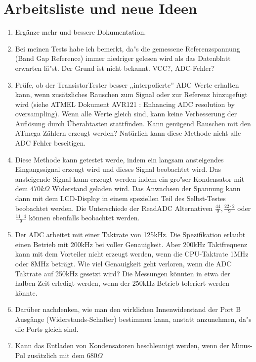
\chapter{Arbeitsliste und neue Ideen}
\label{sec:todo}

\begin{enumerate}
\item Erg\"anze mehr und bessere Dokumentation.
\item Bei meinen Tests habe ich bemerkt, da"s die gemessene Referenzspannung (Band Gap Reference) immer niedriger gelesen
wird als das Datenblatt erwarten l\"a"st.
Der Grund ist nicht bekannt. VCC?, ADC-Fehler?
\item Pr\"ufe, ob der TransistorTester besser ,,interpolierte''  ADC Werte erhalten kann, wenn zus\"atz\-liches Rauschen zum Signal
oder zur Referenz hinzugef\"ugt wird (siehe ATMEL Dokument AVR121 \cite{AVR121}: Enhancing ADC resolution by oversampling).
Wenn alle Werte gleich sind, kann keine Verbesserung der Aufl\"osung durch \"Uberabtasten stattfinden.
Kann gen\"ugend Rauschen mit den ATmega Z\"ahlern erzeugt werden?
Nat\"urlich kann diese Methode nicht alle ADC Fehler beseitigen.
\item Diese Methode kann getestet werde, indem ein langsam ansteigendes Eingangssignal erzeugt wird und dieses
Signal beobachtet wird.
Das ansteigende Signal kann erzeugt werden indem ein gro"ser Kondensator mit dem \(470k\Omega\) Widerstand geladen wird.
Das Anwachsen der Spannung kann dann mit dem LCD-Display in einem speziellen Teil des Selbst-Testes beobachtet werden.
Die Unterschiede der ReadADC Alternativen \(\frac{44}{9}, \frac{22\cdot2}{9}\) oder \(\frac{11\cdot4}{9}\) k\"onnen
ebenfalls beobachtet werden.
\item Der ADC arbeitet mit einer Taktrate von 125kHz. Die Spezifikation erlaubt einen Betrieb mit 200kHz bei voller Genauigkeit.
Aber 200kHz Taktfrequenz kann mit dem Vorteiler nicht erzeugt werden, wenn die CPU-Taktrate 1MHz oder 8MHz betr\"agt.
Wie viel Genauigkeit geht verloren, wenn die ADC Taktrate auf 250kHz gesetzt wird?
Die Messungen k\"onnten in etwa der halben Zeit erledigt werden, wenn der 250kHz Betrieb toleriert werden k\"onnte.
\item Dar\"uber nachdenken, wie man den wirklichen Innenwiderstand der Port B Aus\-g\"an\-ge (Wider\-stands-Schal\-ter) bestimmen kann,
anstatt anzunehmen, da"s die Ports gleich sind.
\item Kann das Entladen von Kondensatoren beschleunigt werden, wenn der Minus-Pol zus\"atzlich mit dem \(680\Omega\) 

\end{enumerate}
